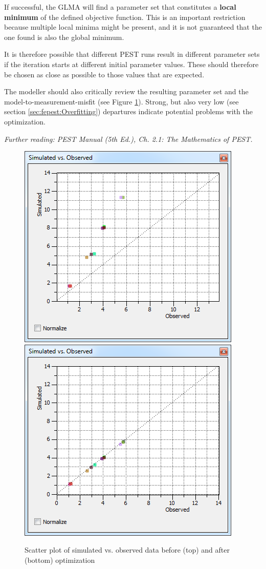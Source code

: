 If successful, the GLMA will find a parameter set that constitutes a \textbf{local minimum} of the defined objective function. This is an important restriction because multiple local minima might be present, and it is not guaranteed that the one found is also the global minimum. 

It is therefore possible that different PEST runs result in different parameter sets if the iteration starts at different initial parameter values. These should therefore be chosen as close as possible to those values that are expected.

The modeller should also critically review the resulting parameter set and the model-to-measurement-misfit (see Figure \ref{fig:fepest:FitToData}). Strong, but also very low (see section \ref{sec:fepest:Overfitting}) departures indicate potential problems with the optimization.

\textit{Further reading: PEST Manual (5th Ed.), Ch. 2.1: The Mathematics of PEST.}


\begin{figure}
	\center
	\includegraphics[width=0.7\columnwidth]{figures/FitToDataBefore.png}
	\vspace{0.5cm}\\
	\includegraphics[width=0.7\columnwidth]{figures/FitToDataAfter.png}
\caption{Scatter plot of simulated vs. observed data before (top) and after (bottom) optimization}
\label{fig:fepest:FitToData}
\end{figure}

